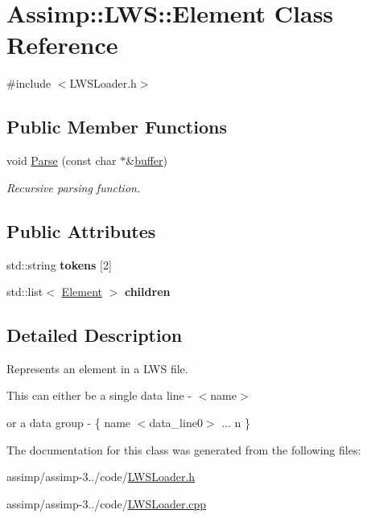 \hypertarget{class_assimp_1_1_l_w_s_1_1_element}{\section{Assimp\+:\+:L\+W\+S\+:\+:Element Class Reference}
\label{class_assimp_1_1_l_w_s_1_1_element}
}


{\ttfamily \#include $<$L\+W\+S\+Loader.\+h$>$}

\subsection*{Public Member Functions}
\begin{DoxyCompactItemize}
\item 
\hypertarget{class_assimp_1_1_l_w_s_1_1_element_a661591a5a155861d0e49c9c37644280e}{void \hyperlink{class_assimp_1_1_l_w_s_1_1_element_a661591a5a155861d0e49c9c37644280e}{Parse} (const char $\ast$\&\hyperlink{structbuffer}{buffer})}\label{class_assimp_1_1_l_w_s_1_1_element_a661591a5a155861d0e49c9c37644280e}

\begin{DoxyCompactList}\small\item\em Recursive parsing function. \end{DoxyCompactList}\end{DoxyCompactItemize}
\subsection*{Public Attributes}
\begin{DoxyCompactItemize}
\item 
\hypertarget{class_assimp_1_1_l_w_s_1_1_element_aad7bee1452a6e5307a7e9db2fe480cf4}{std\+::string {\bfseries tokens} \mbox{[}2\mbox{]}}\label{class_assimp_1_1_l_w_s_1_1_element_aad7bee1452a6e5307a7e9db2fe480cf4}

\item 
\hypertarget{class_assimp_1_1_l_w_s_1_1_element_ac1fb282f93372c04e925a5460cd0d78c}{std\+::list$<$ \hyperlink{class_assimp_1_1_l_w_s_1_1_element}{Element} $>$ {\bfseries children}}\label{class_assimp_1_1_l_w_s_1_1_element_ac1fb282f93372c04e925a5460cd0d78c}

\end{DoxyCompactItemize}


\subsection{Detailed Description}
Represents an element in a L\+W\+S file.

This can either be a single data line -\/ $<$name$>$ 

or a data group -\/ \{ name $<$data\+\_\+line0$>$ ... n \} 

The documentation for this class was generated from the following files\+:\begin{DoxyCompactItemize}
\item 
assimp/assimp-\/3../code/\hyperlink{_l_w_s_loader_8h}{L\+W\+S\+Loader.\+h}\item 
assimp/assimp-\/3../code/\hyperlink{_l_w_s_loader_8cpp}{L\+W\+S\+Loader.\+cpp}\end{DoxyCompactItemize}
